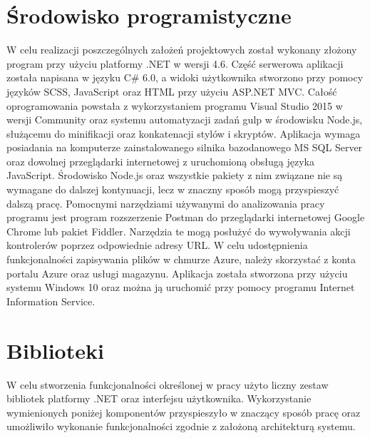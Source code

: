 \section{Środowisko programistyczne}
W celu realizacji poszczególnych założeń projektowych został wykonany złożony program przy użyciu platformy .NET w wersji 4.6. Część serwerowa aplikacji została napisana w języku C\# 6.0, a widoki użytkownika stworzono przy pomocy języków SCSS, JavaScript oraz HTML przy użyciu ASP.NET MVC. Całość oprogramowania powstała z wykorzystaniem programu Visual Studio 2015 w wersji Community oraz systemu automatyzacji zadań gulp\cite{Gulp:limitation} w środowisku Node.js, służącemu do minifikacji oraz konkatenacji stylów i skryptów. Aplikacja wymaga posiadania na komputerze zainstalowanego silnika bazodanowego MS SQL Server oraz dowolnej przeglądarki internetowej z uruchomioną obsługą języka JavaScript. Środowisko Node.js oraz wszystkie pakiety z nim związane nie są wymagane do dalszej kontynuacji, lecz w znaczny sposób mogą przyspieszyć dalszą pracę. Pomocnymi narzędziami używanymi do analizowania pracy programu jest program rozszerzenie Postman\cite{Postman:limitation} do przeglądarki internetowej Google Chrome lub pakiet Fiddler\cite{Fiddler:limitation}. Narzędzia te mogą posłużyć do wywoływania akcji kontrolerów poprzez odpowiednie adresy URL. W celu udostępnienia funkcjonalności zapisywania plików w chmurze Azure, należy skorzystać z konta portalu Azure oraz usługi magazynu. Aplikacja została stworzona przy użyciu systemu Windows 10 oraz można ją uruchomić przy pomocy programu Internet Information Service\cite{IIS:limitation}.

\newpage

\section{Biblioteki}

W celu stworzenia funkcjonalności określonej w pracy użyto liczny zestaw bibliotek platformy .NET oraz interfejsu użytkownika. Wykorzystanie wymienionych poniżej komponentów przyspieszyło w znaczący sposób pracę oraz umożliwiło wykonanie funkcjonalności zgodnie z założoną architekturą systemu.

